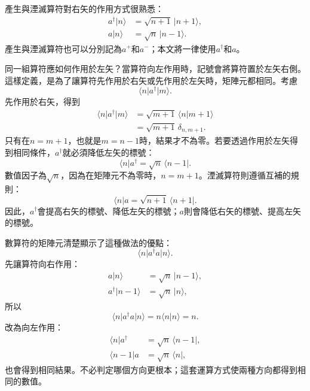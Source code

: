 產生與湮滅算符對右矢的作用方式很熟悉：
\begin{align}
a^\dagger\lvert n\rangle&=\sqrt{n+1}\,\lvert n+1\rangle,\\
a\lvert n\rangle&=\sqrt n\,\lvert n-1\rangle.
\end{align}
產生與湮滅算符也可以分別記為\(a^+\)和\(a^-\)；本文將一律使用\(a^\dagger\)和\(a\)。

同一組算符應如何作用於左矢？當算符向左作用時，記號會將算符置於左矢右側。這樣定義，是為了讓算符先作用於右矢或先作用於左矢時，矩陣元都相同。考慮
\begin{equation}
\langle n\rvert a^\dagger\lvert m\rangle.
\end{equation}
先作用於右矢，得到
\begin{align}
\langle n\rvert a^\dagger\lvert m\rangle
&=\sqrt{m+1}\,\langle n\vert m+1\rangle\\
&=\sqrt{m+1}\,\delta_{n,m+1}.
\end{align}
只有在\(n=m+1\)，也就是\(m=n-1\)時，結果才不為零。若要透過作用於左矢得到相同條件，\(a^\dagger\)就必須降低左矢的標號：
\begin{equation}
\langle n\rvert a^\dagger
=\sqrt n\,\langle n-1\rvert.
\end{equation}
數值因子為\(\sqrt n\)，因為在矩陣元不為零時，\(n=m+1\)。湮滅算符則遵循互補的規則：
\begin{equation}
\langle n\rvert a
=\sqrt{n+1}\,\langle n+1\rvert.
\end{equation}
因此，\(a^\dagger\)會提高右矢的標號、降低左矢的標號；\(a\)則會降低右矢的標號、提高左矢的標號。

數算符的矩陣元清楚顯示了這種做法的優點：
\begin{equation}
\langle n\rvert a^\dagger a\lvert n\rangle.
\end{equation}
先讓算符向右作用：
\begin{align}
a\lvert n\rangle&=\sqrt n\,\lvert n-1\rangle,\\
a^\dagger\lvert n-1\rangle&=\sqrt n\,\lvert n\rangle,
\end{align}
所以
\begin{equation}
\langle n\rvert a^\dagger a\lvert n\rangle
=n\langle n\vert n\rangle=n.
\end{equation}
改為向左作用：
\begin{align}
\langle n\rvert a^\dagger&=\sqrt n\,\langle n-1\rvert,\\
\langle n-1\rvert a&=\sqrt n\,\langle n\rvert,
\end{align}
也會得到相同結果。不必判定哪個方向更根本；這套運算方式使兩種方向都得到相同的數值。

